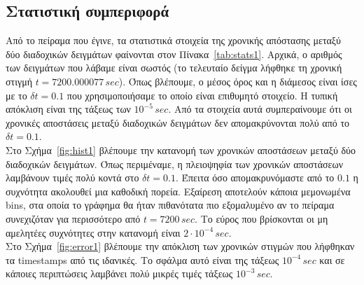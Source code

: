\documentclass[a4paper,12pt]{article}
\begin{document}
\subsection{Στατιστική συμπεριφορά}

Από το πείραμα που έγινε, τα στατιστικά στοιχεία της χρονικής απόστασης μεταξύ δύο διαδοχικών δειγμάτων φαίνονται στον Πίνακα~\ref{tab:stats1}. Αρχικά, ο αριθμός των δειγμάτων που λάβαμε είναι σωστός (το τελευταίο δείγμα λήφθηκε τη χρονική στιγμή $t = 7200.000077 \, sec$). Όπως βλέπουμε, ο μέσος όρος και η διάμεσος είναι ίσες με το $\delta t = 0.1$ που χρησιμοποιήσαμε το οποίο είναι επιθυμητό στοιχείο. Η τυπική απόκλιση είναι της τάξεως των $10^{-5} \, sec$. Από τα στοιχεία αυτά συμπεραίνουμε ότι οι χρονικές αποστάσεις μεταξύ διαδοχικών δειγμάτων δεν απομακρύνονται πολύ από το $\delta t = 0.1$. \\
Στο Σχήμα~\ref{fig:hist1} βλέπουμε την κατανομή των χρονικών αποστάσεων μεταξύ δύο διαδοχικών δειγμάτων. Όπως περιμέναμε, η πλειοψηφία των χρονικών αποστάσεων λαμβάνουν τιμές πολύ κοντά στο $\delta t = 0.1$. Έπειτα όσο απομακρυνόμαστε από το $0.1$ η συχνότητα ακολουθεί μια καθοδική πορεία. Εξαίρεση αποτελούν κάποια μεμονωμένα \textlatin{bins}, στα οποία το γράφημα θα ήταν πιθανότατα πιο εξομαλυμένο αν το πείραμα συνεχιζόταν για περισσότερο από $t = 7200 \, sec$. Το εύρος που βρίσκονται οι μη αμελητέες συχνότητες στην κατανομή είναι $2 \cdot 10^{-4} \, sec$. \\
Στο Σχήμα~\ref{fig:error1} βλέπουμε την απόκλιση των χρονικών στιγμών που λήφθηκαν τα \textlatin{timestamps} από τις ιδανικές. Το σφάλμα αυτό είναι της τάξεως $10^{-4} \, sec$ και σε κάποιες περιπτώσεις λαμβάνει πολύ μικρές τιμές τάξεως $10^{-3} \, sec$.
\end{document}
